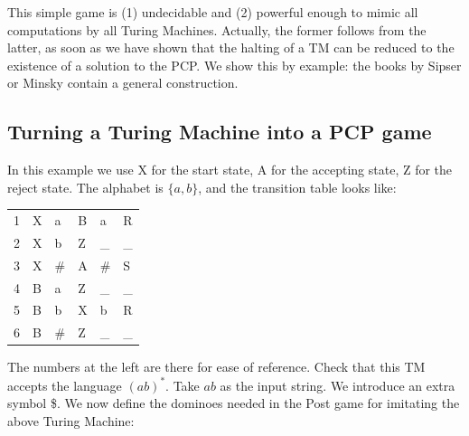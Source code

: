 This simple game is (1) undecidable and (2) powerful enough to mimic all
computations by all Turing Machines. Actually, the former follows from
the latter, as soon as we have shown that the halting of a TM can be
reduced to the existence of a solution to the PCP. We show this by
example: the books by Sipser or Minsky contain a general construction.

\subsection{Turning a Turing Machine into a PCP game}

In this example we use X for the start state, A for the accepting
state, Z for the reject state. The alphabet is $\{a,b\}$, and the
transition table looks like:

\begin{center}
\begin{tabular}{|r||l|l||l|l|l|}
\hline
1 & X & a & B & a & R \\
2 & X & b & Z & \_ & \_ \\
3 & X & \# & A & \# & S \\
4 & B & a  & Z & \_ & \_ \\
5 & B & b  & X & b  & R  \\
6 & B & \# & Z & \_ & \_ \\
\hline
\end{tabular}
\end{center}

The numbers at the left are there for ease of reference. Check that
this TM accepts the language $(ab)^*$. Take $ab$ as the input string.
%
We introduce an extra symbol \$. We now define the dominoes needed in
the Post game for imitating the above Turing Machine:

